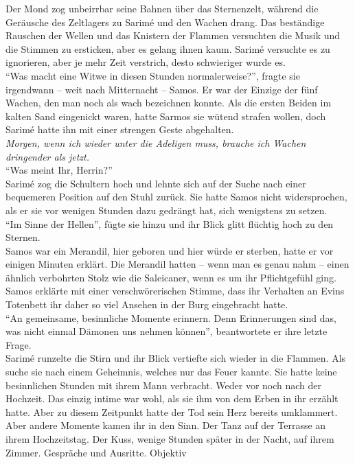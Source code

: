 Der Mond zog unbeirrbar seine Bahnen über das Sternenzelt, während die Geräusche des Zeltlagers zu 
Sarimé und den Wachen drang. Das beständige Rauschen der Wellen und das Knistern der Flammen 
versuchten die Musik und die Stimmen zu ersticken, aber es gelang ihnen kaum. Sarimé versuchte es 
zu ignorieren, aber je mehr Zeit verstrich, desto schwieriger wurde es. \\
``Was macht eine Witwe in diesen Stunden normalerweise?'', fragte sie irgendwann – weit nach 
Mitternacht – Samos. Er war der Einzige der fünf Wachen, den man noch als wach bezeichnen konnte. 
Als die ersten Beiden im kalten Sand eingenickt waren, hatte Sarmos sie wütend strafen wollen, doch 
Sarimé hatte ihn mit einer strengen Geste abgehalten.\\
\textit{Morgen, wenn ich wieder unter die Adeligen muss, brauche ich Wachen dringender als jetzt.}\\
``Was meint Ihr, Herrin?''\\
Sarimé zog die Schultern hoch und lehnte sich auf der Suche nach einer bequemeren Position auf den 
Stuhl zurück. Sie hatte Samos nicht widersprochen, als er sie vor wenigen Stunden dazu gedrängt 
hat, sich wenigstens zu setzen. \\
``Im Sinne der Hellen'', fügte sie hinzu und ihr Blick glitt flüchtig hoch zu den Sternen.\\
Samos war ein Merandil, hier geboren und hier würde er sterben, hatte er vor einigen Minuten 
erklärt. Die Merandil hatten – wenn man es genau nahm – einen ähnlich verbohrten Stolz wie die 
Saleicaner, wenn es um ihr Pflichtgefühl ging. Samos erklärte mit einer verschwörerischen Stimme, 
dass ihr Verhalten an Evins Totenbett ihr daher so viel Ansehen in der Burg eingebracht hatte. \\
``An gemeinsame, besinnliche Momente erinnern. Denn Erinnerungen sind das, was nicht einmal Dämonen 
uns nehmen können'', beantwortete er ihre letzte Frage.\\
Sarimé runzelte die Stirn und ihr Blick vertiefte sich wieder in die Flammen. Als suche sie nach 
einem Geheimnis, welches nur das Feuer kannte. Sie hatte keine besinnlichen Stunden mit ihrem 
Mann verbracht. Weder vor noch nach der Hochzeit. Das einzig intime war wohl, als sie ihm von dem 
Erben in ihr erzählt hatte. Aber zu diesem Zeitpunkt hatte der Tod sein Herz bereits umklammert.
Aber andere Momente kamen ihr in den Sinn. Der Tanz auf der Terrasse an ihrem Hochzeitstag. Der 
Kuss, wenige Stunden später in der Nacht, auf ihrem Zimmer. Gespräche und Ausritte. Objektiv 
